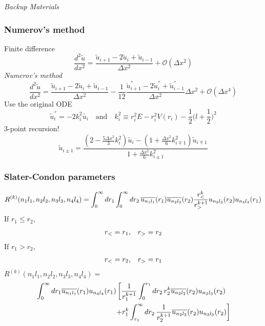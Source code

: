 \begin{frame}[t]
  \vspace{5em}
  \begin{center}
    \Huge \emph{Backup Materials}
  \end{center}
\end{frame}

\begin{frame}[t]
  \frametitle{Numerov's method}
  \footnotesize
  Finite difference
  \[\frac{d^2\tilde{u}}{dx^2} = \frac{\tilde{u}_{i+1} - 2\tilde{u}_i + \tilde{u}_{i-1}}{\Delta x^2} + \mathcal{O}(\Delta x^2)\]
  \emph{Numerov's method}
  \[\frac{d^2\tilde{u}}{dx^2} = \frac{\tilde{u}_{i+1} - 2\tilde{u}_i + \tilde{u}_{i-1}}{\Delta x^2} - \frac{1}{12}\frac{\tilde{u}_{i+1}^{''} - 2\tilde{u}_i^{''} + \tilde{u}_{i-1}^{''}}{\Delta x^2}\Delta x^2 + \mathcal{O}(\Delta x^4)\]
  Use the original ODE
  \[\tilde{u}_i^{''} = -2 k_i^2 \tilde{u_i}
  \quad \text{and} \quad k_i^2 \equiv r_i^2 E - r_i^2 V(r_i) - \frac{1}{2} \Big(l+\frac{1}{2}\Big)^2\]
  3-point \alert{recursion}!
  \[\tilde{u}_{i\pm1} = \frac{(2-\frac{5\Delta x^2}{3}k_i^2)\tilde{u}_i - (1+\frac{\Delta x^2}{6}k_{i\mp1}^2)\tilde{u}_{i\mp1}}{1+\frac{\Delta x^2}{6}k_{i\pm1}^2}\]
\end{frame}

\begin{frame}[t]
  \frametitle{Slater-Condon parameters}
  \footnotesize
  \vspace{-2em}
  \[
  R^{(k)}(n_1l_1,n_2l_2,n_3l_3,n_4l_4) =
  \int_0^\infty dr_1 \int_0^\infty dr_2\, \overline{u_{n_1l_1}}(r_1) \overline{u_{n_2l_2}}(r_2)
  \frac{r_<^k}{r_>^{k+1}} u_{n_3l_3}(r_2) u_{n_4l_4}(r_1)
  \]
  If $r_1 \le r_2$,
  \[
    \begin{array}{c c}
    r_<=r_1, & r_>=r_2
    \end{array}
  \]
  If $r_1 > r_2$,
  \[
    \begin{array}{c c}
    r_<=r_2, & r_>=r_1
    \end{array}
  \]
  $R^{(k)}(n_1l_1,n_2l_2,n_3l_3,n_4l_4) = $
  \[
  \begin{aligned}
  & \int_0^\infty dr_1
  \overline{u_{n_1l_1}}(r_1)u_{n_4l_4}(r_1)
  \left[ \frac{1}{r_1^{k+1}} \int_0^{r_1} dr_2\, r_2^k \overline{u_{n_2l_2}}(r_2)u_{n_3l_3}(r_2) \right. \\
  & \qquad\qquad\qquad\qquad\qquad\quad
  \left. + r_1^k \int_{r_1}^\infty dr_2\, \frac{1}{r_2^{k+1}} \overline{u_{n_2l_2}}(r_2)u_{n_3l_3}(r_2) \right]
  \end{aligned}
  \]
\end{frame}

